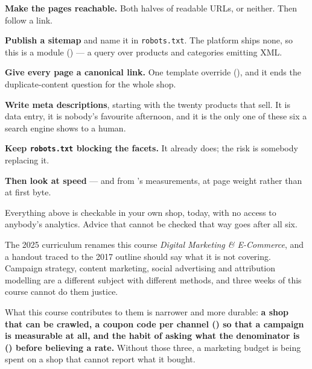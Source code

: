 \begin{conceptbox}
\begin{tightnum}
  \item \textbf{Make the pages reachable.} Both halves of readable URLs, or
        neither. Then follow a link.
  \item \textbf{Publish a sitemap} and name it in \texttt{robots.txt}. The
        platform ships none, so this is a module () ---
        a query over products and categories emitting XML.
  \item \textbf{Give every page a canonical link.} One template override
        (), and it ends the duplicate-content question for the whole
        shop.
  \item \textbf{Write meta descriptions}, starting with the twenty products
        that sell. It is data entry, it is nobody's favourite afternoon, and
        it is the only one of these six a search engine shows to a human.
  \item \textbf{Keep \texttt{robots.txt} blocking the facets.} It already does;
        the risk is somebody replacing it.
  \item \textbf{Then look at speed} --- and from 's measurements,
        at page weight rather than at first byte.
\end{tightnum}

\smallskip
Everything above is checkable in your own shop, today, with no access to
anybody's analytics. Advice that cannot be checked that way goes after all six.
\end{conceptbox}

\begin{alertbox}
The 2025 curriculum renames this course \emph{Digital Marketing \&
E-Commerce}, and a handout traced to the 2017 outline should say what it is not
covering. Campaign strategy, content marketing, social advertising and
attribution modelling are a different subject with different methods, and three
weeks of this course cannot do them justice.

\smallskip
What this course contributes to them is narrower and more durable:
\textbf{a shop that can be crawled, a coupon code per channel
() so that a campaign is measurable at all, and the habit of
asking what the denominator is () before believing a rate.}
Without those three, a marketing budget is being spent on a shop that cannot
report what it bought.
\end{alertbox}

